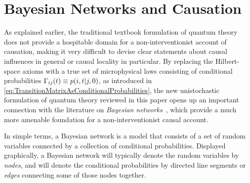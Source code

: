 \documentclass[twoside,twocolumn,english,prl,superscriptaddress,nobibnotes,nofootinbib]{revtex4-2}
\let\originalleft\left
\let\originalright\right
\renewcommand{\left}{\mathopen{}\mathclose\bgroup\originalleft}
\renewcommand{\right}{\aftergroup\egroup\originalright}
\begin{document}
\section{Bayesian Networks and Causation\label{sec:Bayesian-Networks-and-Causation}}

As explained earlier, the traditional textbook formulation of quantum
theory does not provide a hospitable domain for a non-interventionist
account of causation, making it very difficult to devise clear statements
about causal influences in general or causal locality in particular.
By replacing the Hilbert-space axioms with a true set of microphysical
laws consisting of conditional probabilities $\stochasticmatrix_{ij}\left(t\right)\defeq p\left(i,t\given j,0\right)$,
as introduced in \eqref{eq:TransitionMatrixAsConditionalProbabilities},
the new unistochastic formulation of quantum theory reviewed in this
paper opens up an important connection with the literature on \emph{Bayesian networks}~\citep{Pearl:2009cmrai},
which provide a much more amenable foundation for a non-interventionist
causal account.

In simple terms, a Bayesian network is a model that consists of a
set of random variables connected by a collection of conditional probabilities.
Displayed graphically, a Bayesian network will typically denote the
random variables by \emph{nodes}, and will denote the conditional
probabilities by directed line segments or \emph{edges} connecting
some of those nodes together.
\end{document}
